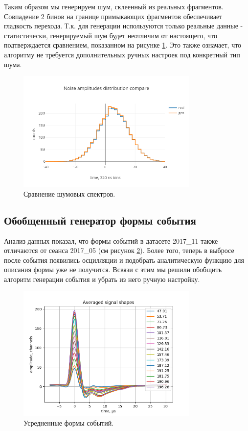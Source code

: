 \documentclass[a4paper,14pt]{extreport}
\begin{document}
Таким образом мы генерируем шум, склеенный из реальных фрагментов. Совпадение 2 бинов на границе примыкающих фрагментов обеспечивает гладкость перехода. Т.к. для генерации используются только реальные данные - статистически, генерируемый шум будет неотличим от настоящего, что подтверждается сравнением, показанном на рисунке \ref{fig:signals-noise-generator-dist-new}. Это также означает, что алгоритму не требуется дополнительных ручных настроек под конкретный тип шума.

\begin{figure}
  \centering
  \includegraphics[width = 0.8\textwidth]{img/signals/noise_dist_new.png}
  \caption{Сравнение шумовых спектров.}
  \label{fig:signals-noise-generator-dist-new}
\end{figure}

\subsection{Обобщенный генератор формы события}

Анализ данных показал, что формы событий в датасете 2017\_11 также отличаются от сеанса 2017\_05 (см рисунок \ref{fig:signals-event-shapes-2017-11}). Более того, теперь в выбросе после события появились осцилляции и подобрать аналитическую функцию для описания формы уже не получится. Всвязи с этим мы решили обобщить алгоритм генерации события и убрать из него ручную настройку.

\begin{figure}
  \centering
  \includegraphics[width = 0.8\textwidth]{img/signals/event_shapes_2017_11.png}
  \caption{Усредненные формы событий.}
  \label{fig:signals-event-shapes-2017-11}
\end{figure}
\end{document}
